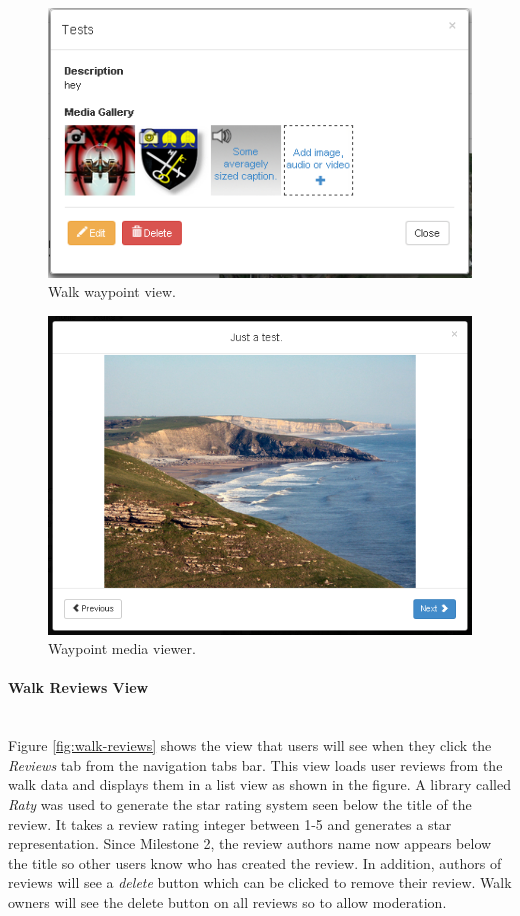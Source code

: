 \documentclass[11pt,a4paper]{report}
\begin{document}
\begin{figure}[H]
\centering
\includegraphics[width=0.7\linewidth]{./img/webportal/waypoint}
\caption{Walk waypoint view.}
\label{fig:waypoint}
\end{figure}

\begin{figure}[H]
\centering
\includegraphics[width=0.7\linewidth]{./img/webportal/media-viewer}
\caption{Waypoint media viewer.}
\label{fig:media-viewer}
\end{figure}


\paragraph{Walk Reviews View}\mbox{}\\
Figure \ref{fig:walk-reviews} shows the view that users will see when they click the \emph{Reviews} tab from the navigation tabs bar. This view loads user reviews from the walk data and displays them in a list view as shown in the figure. A library called \emph{Raty} was used to generate the star rating system seen below the title of the review. It takes a review rating integer between 1-5 and generates a star representation\cite{milestone2}. Since Milestone 2, the review authors name now appears below the title so other users know who has created the review. In addition, authors of reviews will see a \emph{delete} button which can be clicked to remove their review. Walk owners will see the delete button on all reviews so to allow moderation.
\end{document}
